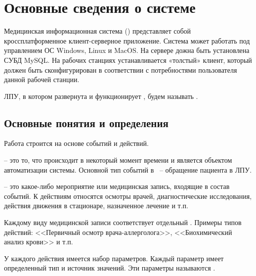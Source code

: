 \newpage
\section{Основные сведения о системе}

Медицинская информационная система (\tmis) представляет собой кроссплатформенное клиент-серверное приложение. Система может работать под управлением ОС Windows, Linux и MacOS. На сервере дожна быть установлена СУБД MySQL. На рабочих станциях устанавливается «толстый» клиент, который должен быть сконфигурирован в соответствии с потребностями пользователя данной рабочей станции.

ЛПУ, в котором развернута и функционирует \tmis, будем называть . 

\subsection{Основные понятия и определения}

Работа \tmis строится на основе событий и действий.

 – это то, что происходит в некоторый момент времени и является объектом автоматизации системы. Основной тип событий в \tmis~-- обращение пациента в ЛПУ. 

 – это какое-либо мероприятие или медицинская запись, входящие в состав событий. К действиям относятся осмотры врачей, диагностические исследования, действия движения в стационаре, назначенное лечение и т.п. 

Каждому виду медицинской записи соответствует отдельный  . Примеры типов действий: <<Первичный осмотр врача-аллерголога>>, <<Биохимический анализ крови>> и т.п. 

У каждого действия имеется набор параметров. Каждый параметр имеет определенный тип и источник значений. Эти параметры называются .  
